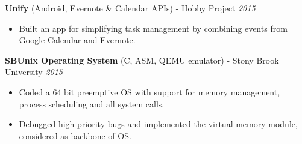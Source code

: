 \documentclass[12pt]{article}
\newcommand{\sectionHeading}[1]{
\vspace{-15pt}
\section*{\small{#1}}
\vspace{-10pt}
\hrule
\vspace{8pt}
}
\newcommand {\projectSectionSubheading}[4]{
    \noindent \small{\textbf{#1} \textit{(#2)} : #3  \hfill \textit{#4}} \\
    \vspace{-10pt}
}
\newcommand {\projectSectionSubheadingAlternate}[4]{
    \noindent \small{\textbf{#1} (#3) - #2 \hfill \textit{#4}} \\
    \vspace{-22pt}
}
\newcommand {\projectSectionSubheadingAlternateNew}[2]{
    \noindent \small{\textbf{#1} \hfill \textit{#2}} \\
    \vspace{-22pt}
}
\newcommand{\sectionListStart}{
    \begin{itemize}[label={\small{\textbullet}}, leftmargin=20pt] %
}
\newcommand{\sectionListEnd}{\end{itemize} \vspace{-5pt}}
\newcommand{\sectionListItem}[1]{\item \small{#1}}
\begin{document}
    
\projectSectionSubheadingAlternate{Unify}{Hobby Project}{Android, Evernote \& Calendar APIs}{2015}
\sectionListStart
    \sectionListItem
        Built an app for simplifying task management by combining events from Google Calendar and Evernote. 
        
\sectionListEnd

\projectSectionSubheadingAlternate{SBUnix Operating System}{Stony Brook University}{C, ASM, QEMU emulator}{2015}
\sectionListStart
    \sectionListItem
        Coded a 64 bit preemptive OS with support for memory management, process scheduling and all system calls. 
    \sectionListItem
        Debugged high priority bugs and implemented the virtual-memory module, considered as backbone of OS. 
\sectionListEnd







\end{document}

